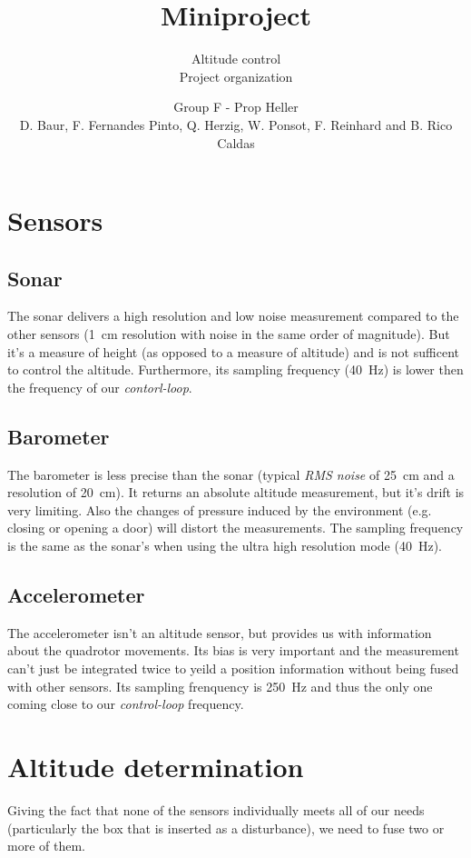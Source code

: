 \documentclass{repMobRob}
\author{Group F - Prop Heller \\ D. Baur, F. Fernandes Pinto, Q. Herzig, W. Ponsot, F. Reinhard and B. Rico Caldas}
\title{Miniproject}
\subtitle{Altitude control \\ \small{Project organization}}
\begin{document}
\thispagestyle{empty}
\maketitle

\section{Sensors}
\subsection{Sonar}
The sonar delivers a high resolution and low noise measurement compared to the other sensors (\SI{1}{\centi\meter} resolution with noise in the same order of magnitude).
But it's a measure of height (as opposed to a measure of altitude) and is not sufficent to control the altitude.
Furthermore, its sampling frequency (\SI{40}{\hertz}) is lower then the frequency of our \emph{contorl-loop}.

\subsection{Barometer}
The barometer is less precise than the sonar (typical \emph{RMS noise} of \SI{25}{\centi\meter} and a resolution of \SI{20}{\centi\meter}).
It returns an absolute altitude measurement, but it's drift is very limiting.
Also the changes of pressure induced by the environment (e.g. closing or opening a door) will distort the measurements.
The sampling frequency is the same as the sonar's when using the ultra high resolution mode (\SI{40}{\hertz}).

\subsection{Accelerometer}
The accelerometer isn't an altitude sensor, but provides us with information about the quadrotor movements.
Its bias is very important and the measurement can't just be integrated twice to yeild a position information without being fused with other sensors.
Its sampling frenquency is \SI{250}{\hertz} and thus the only one coming close to our \emph{control-loop} frequency. 

\section{Altitude determination}
Giving the fact that none of the sensors individually meets all of our needs (particularly the box that is inserted as a disturbance), we need to fuse two or more of them. 
\end{document}
